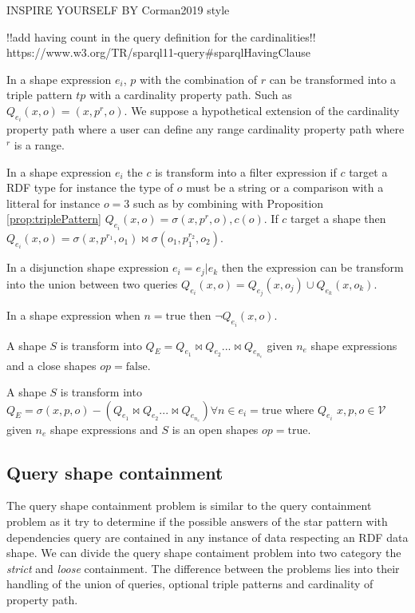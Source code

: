 INSPIRE YOURSELF BY Corman2019 style

!!add having count in the query definition for the cardinalities!!
https://www.w3.org/TR/sparql11-query\#sparqlHavingClause

\begin{prop}\label{prop:triplePattern}
   In a shape expression $e_i$, $p$ with the combination of $r$ can be transformed into a triple pattern $tp$ with a cardinality property path.
   Such as $Q_{e_i}(x,o) = (x, p^r, o)$. 
   We suppose a hypothetical extension of the cardinality property path where a user can define any range cardinality property path where $^r$ is a range.
\end{prop}

\begin{prop}
   In a shape expression $e_i$ the $c$ is transform into a filter expression if $c$ target a RDF type for instance the type of $o$ must be a string or
   a comparison with a litteral for instance $o=3$ such as by combining with Proposition \ref{prop:triplePattern} $Q_{e_i}(x,o) = \sigma(x, p^r, o), c(o)$.
   If $c$ target a shape then $Q_{e_i}(x,o) = \sigma(x, p^{r_{1}}, o_1) \bowtie \sigma(o_1, p_1^{r_2}, o_2)$.
\end{prop}

\begin{prop}
   In a disjunction shape expression $e_i = e_j|e_k$ then the expression can be transform into the union between two queries
   $Q_{e_i}(x,o)= Q_{e_j}(x,o_j) \cup Q_{e_k}(x,o_k)$.
\end{prop}

\begin{prop}
   In a shape expression when $n= \mathrm{true}$ then $\neg Q_{e_i}(x,o)$.
\end{prop}

\begin{prop}
   A shape $S$ is transform into $Q_{E} = Q_{e_1} \bowtie Q_{e_2} ... \bowtie Q_{e_{n_e}}$ given $n_e$ shape expressions and a close shapes $op = \mathrm{false}$.
\end{prop}

\begin{prop}
   A shape $S$ is transform into $Q_{E} = \sigma(x, p, o) -  (Q_{e_1} \bowtie Q_{e_2} ... \bowtie Q_{e_{n_e}}) \forall n \in e_i = \mathrm{true} $ where $Q_{e_i}$ 
   $x,p, o \in \mathcal{V}$ given $n_e$ shape expressions and $S$ is an open shapes $op = \mathrm{true}$.
\end{prop}

\subsection{Query shape containment}
The query shape containment problem is similar to the query containment problem as it 
try to determine if the possible answers of the star pattern with dependencies query are contained in any instance of data respecting an RDF data shape.
We can divide the query shape contaiment problem into two category the \emph{strict} and \emph{loose} containment.
The difference between the problems lies into their handling of the union of queries, optional triple patterns and cardinality of property path.


